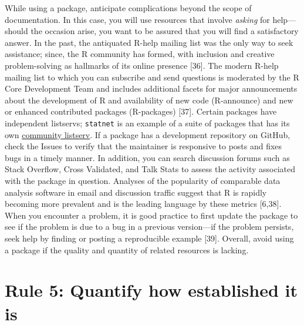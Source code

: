 \documentclass[10pt,letterpaper]{article}
\begin{document}
While using a package, anticipate complications beyond the scope of
documentation. In this case, you will use resources that involve
\emph{asking} for help---should the occasion arise, you want to be
assured that you will find a satisfactory answer. In the past, the
antiquated R-help mailing list was the only way to seek assistance;
since, the R community has formed, with inclusion and creative
problem-solving as hallmarks of its online presence {[}36{]}. The modern
R-help mailing list to which you can subscribe and send questions is
moderated by the R Core Development Team and includes additional facets
for major announcements about the development of R and availability of
new code (R-announce) and new or enhanced contributed packages
(R-packages) {[}37{]}. Certain packages have independent listservs;
\texttt{statnet} is an example of a suite of packages that has its own
\href{http://statnet.org/}{community listserv}. If a package has a
development repository on GitHub, check the Issues to verify that the
maintainer is responsive to posts and fixes bugs in a timely manner. In
addition, you can search discussion forums such as Stack Overflow, Cross
Validated, and Talk Stats to assess the activity associated with the
package in question. Analyses of the popularity of comparable data
analysis software in email and discussion traffic suggest that R is
rapidly becoming more prevalent and is the leading language by these
metrics {[}6,38{]}. When you encounter a problem, it is good practice to
first update the package to see if the problem is due to a bug in a
previous version---if the problem persists, seek help by finding or
posting a reproducible example {[}39{]}. Overall, avoid using a package
if the quality and quantity of related resources is lacking.

\hypertarget{rule-5-quantify-how-established-it-is}{%
\section{Rule 5: Quantify how established it
is}\label{rule-5-quantify-how-established-it-is}}
\end{document}
